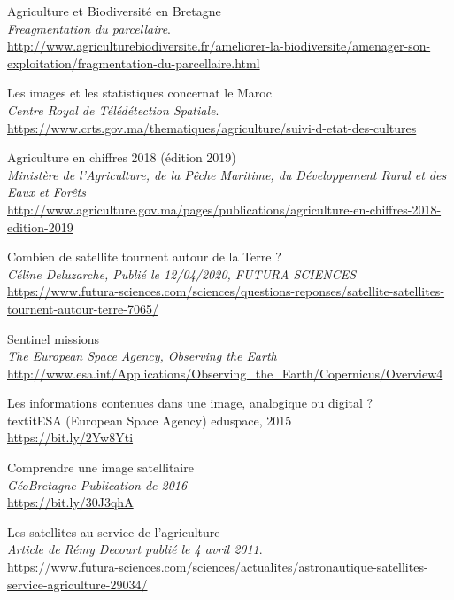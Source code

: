 \documentclass[12pt, openany]{report}
\begin{document}
\begin{thebibliography}{9}


Agriculture et Biodiversité en Bretagne\\
\textit{Freagmentation du parcellaire}. \\
\url{http://www.agriculturebiodiversite.fr/ameliorer-la-biodiversite/amenager-son-exploitation/fragmentation-du-parcellaire.html}

Les images et les statistiques concernat le Maroc\\
\textit{Centre Royal de Télédétection Spatiale}.\\
\url{https://www.crts.gov.ma/thematiques/agriculture/suivi-d-etat-des-cultures}

Agriculture en chiffres 2018 (édition 2019)\\
\textit{Ministère de l'Agriculture, de la Pêche Maritime, du Développement Rural et des Eaux et Forêts}\\
\url{http://www.agriculture.gov.ma/pages/publications/agriculture-en-chiffres-2018-edition-2019}

Combien de satellite tournent autour de la Terre ?\\
\textit{Céline Deluzarche, Publié le 12/04/2020, FUTURA SCIENCES}\\
\url{https://www.futura-sciences.com/sciences/questions-reponses/satellite-satellites-tournent-autour-terre-7065/}

Sentinel missions\\
\textit{The European Space Agency, Observing the Earth}\\
\url{http://www.esa.int/Applications/Observing_the_Earth/Copernicus/Overview4}

Les informations contenues dans une image, analogique ou digital ?\\
textit{ESA (European Space Agency) eduspace, 2015}\\
\url{https://bit.ly/2Yw8Yti}

Comprendre une image satellitaire\\
\textit{GéoBretagne Publication de 2016}\\
\url{https://bit.ly/30J3qhA}

Les satellites au service de l'agriculture\\
\textit{Article de Rémy Decourt publié le 4 avril 2011}.\\
\url{https://www.futura-sciences.com/sciences/actualites/astronautique-satellites-service-agriculture-29034/}


\end{thebibliography}
\end{document}
